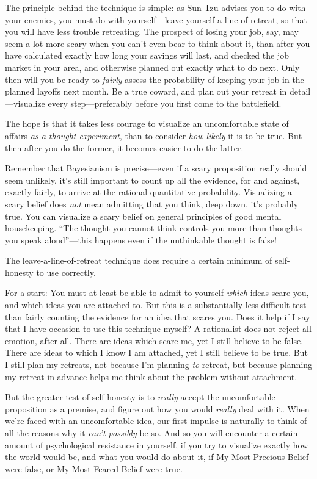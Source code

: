 {
 The principle behind the technique is simple: as Sun Tzu advises
you to do with your enemies, you must do with yourself---leave yourself
a line of retreat, so that you will have less trouble retreating. The
prospect of losing your job, say, may seem a lot more scary when you
can't even bear to think about it, than after you have
calculated exactly how long your savings will last, and checked the job
market in your area, and otherwise planned out exactly what to do next.
Only then will you be ready to \textit{fairly} assess the probability
of keeping your job in the planned layoffs next month. Be a true
coward, and plan out your retreat in detail---visualize every
step---preferably before you first come to the battlefield.}

{
 The hope is that it takes less courage to visualize an
uncomfortable state of affairs \textit{as a thought experiment}, than
to consider \textit{how likely} it is to be true. But then after you do
the former, it becomes easier to do the latter.}

{
 Remember that Bayesianism is precise---even if a scary proposition
really should seem unlikely, it's still important to
count up all the evidence, for and against, exactly fairly, to arrive
at the rational quantitative probability. Visualizing a scary belief
does \textit{not} mean admitting that you think, deep down,
it's probably true. You can visualize a scary belief on
general principles of good mental housekeeping. ``The
thought you cannot think controls you more than thoughts you speak
aloud''---this happens even if the unthinkable
thought is false!}

{
 The leave-a-line-of-retreat technique does require a certain
minimum of self-honesty to use correctly.}

{
 For a start: You must at least be able to admit to yourself
\textit{which} ideas scare you, and which ideas you are attached to.
But this is a substantially less difficult test than fairly counting
the evidence for an idea that scares you. Does it help if I say that I
have occasion to use this technique myself? A rationalist does not
reject all emotion, after all. There are ideas which scare me, yet I
still believe to be false. There are ideas to which I know I am
attached, yet I still believe to be true. But I still plan my retreats,
not because I'm planning \textit{to} retreat, but
because planning my retreat in advance helps me think about the problem
without attachment.}

{
 But the greater test of self-honesty is to \textit{really} accept
the uncomfortable proposition as a premise, and figure out how you
would \textit{really} deal with it. When we're faced
with an uncomfortable idea, our first impulse is naturally to think of
all the reasons why it \textit{can't possibly} be so.
And so you will encounter a certain amount of psychological resistance
in yourself, if you try to visualize exactly how the world would be,
and what you would do about it, if My-Most-Precious-Belief were false,
or My-Most-Feared-Belief were true.}

